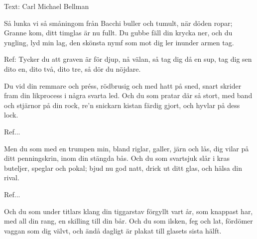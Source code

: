 \begin{SongText}
\begin{SongInfo}
    Text: Carl Michael Bellman
\end{SongInfo}
\begin{SongVerse}
Så lunka vi så småningom
från Bacchi buller och tumult,
när döden ropar; Granne kom,
ditt timglas är nu fullt.
Du gubbe fäll din krycka ner,
och du yngling, lyd min lag,
den skönsta nymf som mot dig ler
inunder armen tag. 
\end{SongVerse}
\begin{SongVerse}
Ref:
Tycker du att graven är för djup,
nå välan, så tag dig då en sup,
tag dig sen dito en, dito två, dito tre,
så dör du nöjdare.
\end{SongVerse}
\begin{SongVerse}
Du vid din remmare och préss,
rödbrusig och med hatt på sned,
snart skrider fram din likprocess
i några svarta led.
Och du som pratar där så stort,
med band och stjärnor på din rock,
re’n snickarn kistan färdig gjort,
och hyvlar på dess lock. 
\end{SongVerse}
\begin{SongVerse}
Ref...
\end{SongVerse}
\begin{SongVerse}
Men du som med en trumpen min,
bland riglar, galler, järn och lås,
dig vilar på ditt penningskrin,
inom din stängda bås.
Och du som svartsjuk slår i kras
buteljer, speglar och pokal;
bjud nu god natt, drick ut ditt glas,
och hälsa din rival.
\end{SongVerse}
\begin{SongVerse}
Ref...
\end{SongVerse}
\begin{SongVerse}
Och du som under titlars klang
din tiggarstav förgyllt vart år,
som knappast har, med all din rang,
en skilling till din bår.
Och du som ilsken, feg och lat,
fördömer vaggan som dig välvt,
och ändå dagligt är plakat
till glasets sista hälft. 
\end{SongVerse}

\end{SongText}
